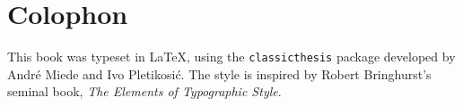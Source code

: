\pagestyle{empty}

\hfill

\vfill


\section*{Colophon}
This book was typeset in \LaTeX, using the \texttt{classicthesis} package developed by Andr\'e Miede and Ivo Pletikosić. The style is inspired by Robert Bringhurst's seminal book, \emph{The Elements of Typographic Style}.
%
%


%
%
